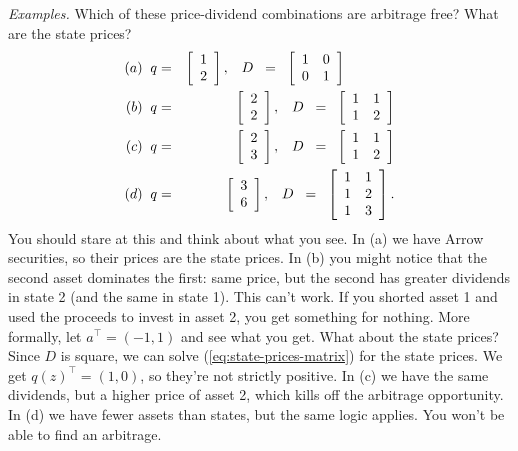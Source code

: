 \documentclass[11pt]{article}
\begin{document}
{\it Examples.\/}
Which of these price-dividend combinations are arbitrage free?
What are the state prices?
\begin{eqnarray*}
  (a) \;\;  q &=& \left[
            \begin{array}{c}
             1 \\ 2
            \end{array}
          \right], \;\;\;
        D \;\;=\;\;
            \left[
            \begin{array}{cc}
             1 & 0 \\ 0 & 1
            \end{array}
          \right]    \hspace*{0.5in}  \\
  (b) \;\;  q &=& \left[
            \begin{array}{c}
             2 \\ 2
            \end{array}
          \right], \;\;\;
        D \;\;=\;\;
            \left[
            \begin{array}{cc}
             1 & 1 \\ 1 & 2
            \end{array}
          \right]      \\
  (c) \;\;    q &=& \left[
            \begin{array}{c}
             2 \\ 3
            \end{array}
          \right], \;\;\;
        D \;\;=\;\;
            \left[
            \begin{array}{cc}
             1 & 1 \\ 1 & 2
            \end{array}
          \right]      \\
  (d) \;\;    q &=& \left[
            \begin{array}{c}
             3 \\ 6
            \end{array}
          \right], \;\;\;
        D \;\;=\;\;
            \left[
            \begin{array}{cc}
             1 & 1 \\ 1 & 2 \\ 1 & 3
            \end{array}
          \right]    .
\end{eqnarray*}
You should stare at this and think about what you see.
In (a) we have Arrow securities,
so their prices are the state prices.
In (b) you might notice that the second asset dominates the first:
same price, but the second has greater dividends in state 2
(and the same in state 1).
This can't work.  If you shorted asset 1 and used the proceeds to invest
in asset 2, you get something for nothing.
More  formally, let $a^\top = (-1,1)$ and see what you get.
What about the state prices?
Since $D$ is square, we can solve (\ref{eq:state-prices-matrix})
for the state prices.
We get $q(z)^\top = (1, 0)$, so they're not strictly positive.
In (c) we have the same dividends, but a higher price of asset 2,
which kills off the arbitrage opportunity.
In (d) we have fewer assets than states, but the same logic applies.
You won't be able to find an arbitrage.
\end{document}
